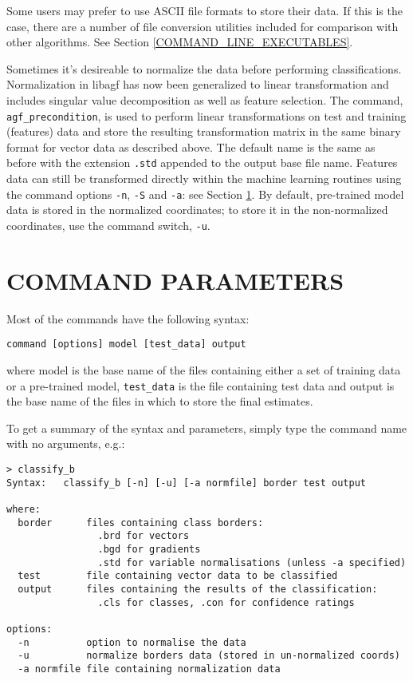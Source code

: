 \documentclass[12pt]{article}
\begin{document}
Some users may prefer to use ASCII file formats to store their data.  If this is the case, there are a number of file conversion utilities included for comparison with other algorithms.  See Section \ref{COMMAND_LINE_EXECUTABLES}.

Sometimes it's desireable to normalize the data before performing classifications.  Normalization in libagf has now been generalized to linear transformation and includes singular value decomposition as well as feature selection.  The command, \verb"agf_precondition", is used to perform linear transformations on test and training (features) data and store the resulting transformation matrix in the same binary format for vector data as described above.  The default name is the same as before with the extension \verb".std" appended to the output base file name.  Features data can still be transformed directly within the machine learning routines using the command options \verb"-n", \verb"-S" and \verb"-a": see Section \ref{COMMAND_PARAMETERS}.  By default, pre-trained model data is stored in the normalized coordinates; to store it in the non-normalized coordinates, use the command switch, \verb"-u".

\section{COMMAND PARAMETERS}

\label{COMMAND_PARAMETERS}

Most of the commands have the following syntax:

\begin{verbatim}
command [options] model [test_data] output
\end{verbatim}

where model is the base name of the files containing either a set of training data or a pre-trained model, \verb/test_data/ is the file containing test data and output is the base name of the files in which to store the final estimates.

To get a summary of the syntax and parameters, simply type the command name with no arguments, e.g.:

\begin{verbatim}
> classify_b
Syntax:   classify_b [-n] [-u] [-a normfile] border test output

where:
  border      files containing class borders:
                .brd for vectors
                .bgd for gradients
                .std for variable normalisations (unless -a specified)
  test        file containing vector data to be classified
  output      files containing the results of the classification:
                .cls for classes, .con for confidence ratings

options:
  -n          option to normalise the data
  -u          normalize borders data (stored in un-normalized coords)
  -a normfile file containing normalization data
\end{verbatim}
\end{document}
